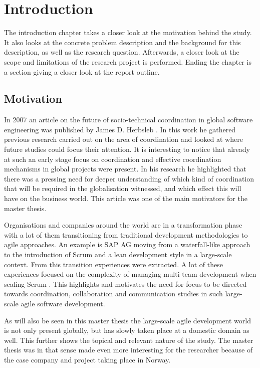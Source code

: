 \chapter{Introduction}


\minitoc

The introduction chapter takes a closer look at the motivation behind the study. It also looks at the concrete problem description and the background for this description, as well as the research question. Afterwards, a closer look at the scope and limitations of the research project is performed. Ending the chapter is a section giving a closer look at the report outline.

\newpage

\section{Motivation}

In 2007 an article on the future of socio-technical coordination in global software engineering was published by James D. Herbsleb \cite{Herbsleb2007}. In this work he gathered previous research carried out on the area of coordination and looked at where future studies could focus their attention. It is interesting to notice that already at such an early stage focus on coordination and effective coordination mechanisms in global projects were present. In his research he highlighted that there was a pressing need for deeper understanding of which kind of coordination that will be required in the globalisation witnessed, and which effect this will have on the business world. This article was one of the main motivators for the master thesis.

Organisations and companies around the world are in a transformation phase with a lot of them transitioning from traditional development methodologies to agile approaches. An example is SAP AG moving from a waterfall-like approach to the introduction of Scrum and a lean development style in a large-scale context. From this transition experiences were extracted. A lot of these experiences focused on the complexity of managing multi-team development when scaling Scrum \cite{Nord2011}. This highlights and motivates the need for focus to be directed towards coordination, collaboration and communication studies in such large-scale agile software development.

As will also be seen in this master thesis the large-scale agile development world is not only present globally, but has slowly taken place at a domestic domain as well. This further shows the topical and relevant nature of the study. The master thesis was in that sense made even more interesting for the researcher because of the case company and project taking place in Norway.


